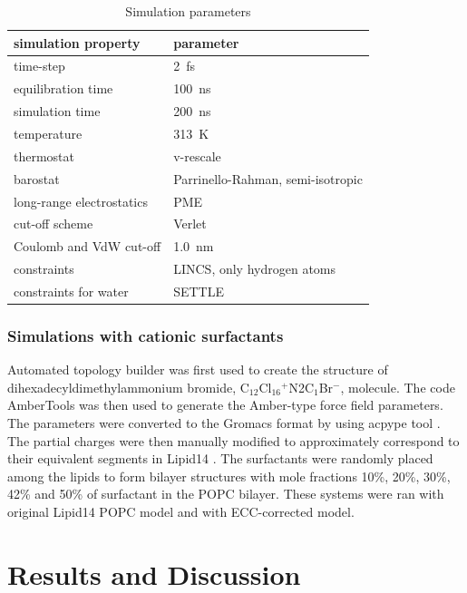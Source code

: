 \documentclass[aip,jcp,twocolumn]{revtex4}
\begin{document}
\begin{table}[btp]
  \caption{Simulation parameters}
  \label{tbl:mdpar}
  \begin{tabular}{ll}
    simulation property & parameter   \\
    \hline
    time-step           & 2~fs         \\
    equilibration time  & 100~ns  \\
    simulation time     & 200~ns  \\
    temperature         & 313~K       \\
    thermostat          & v-rescale  \cite{bussi07}   \\
    barostat            & Parrinello-Rahman, semi-isotropic \cite{parrinello81} \\
    long-range electrostatics & PME  \cite{darden93}  \\
    cut-off scheme      & Verlet \cite{Pall13}      \\
    Coulomb and VdW cut-off & 1.0~nm \\
    constraints         & LINCS, only hydrogen atoms \cite{hess97} \\
    constraints for water & SETTLE  \cite{miyamoto92} \\
    \hline
  \end{tabular}
\end{table}


\subsubsection{Simulations with cationic surfactants}
Automated topology builder \cite{malde11} was first used to create the structure of
dihexadecyldimethylammonium bromide, C$_{12}$Cl$_{16}$$^+$N2C$_1$Br$^-$, molecule.
The code AmberTools \cite{amber} was then used to generate the Amber-type force field
parameters. The parameters were converted to the Gromacs format by using
acpype tool \cite{acpype}. The partial charges were then manually modified
to approximately correspond to their equivalent segments in Lipid14 \cite{dickson14}.
The surfactants were randomly placed among the lipids to form bilayer structures with
mole fractions 10\%, 20\%, 30\%, 42\% and 50\% of surfactant in the POPC bilayer.
These systems were ran with original Lipid14 POPC model and with ECC-corrected model.

\section{Results and Discussion}
\end{document}
